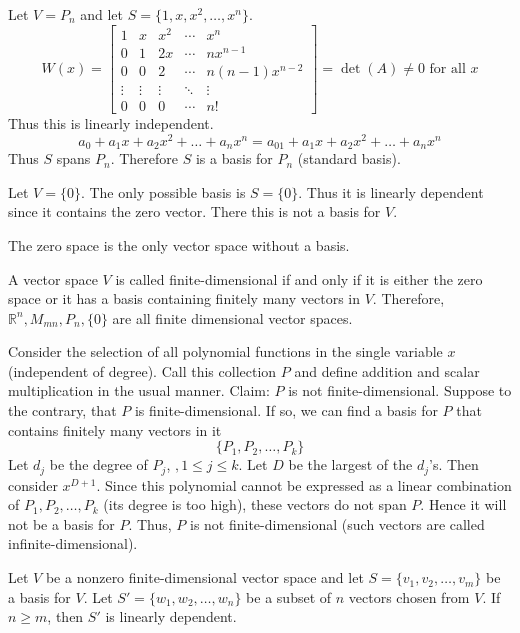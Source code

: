 \documentclass[12pt]{article}
\begin{document}
\begin{example} Let $V = P_n$ and let $S = \{1, x, x^2, \dots, x^n\}$. $$W(x) = \begin{bmatrix} 1 & x & x^2 & \cdots & x^n \\ 0 & 1 & 2x & \cdots & nx^{n - 1} \\ 0 & 0 & 2 & \cdots & n(n - 1)x^{n - 2} \\ \vdots & \vdots & \vdots & \ddots & \vdots \\ 0 & 0 & 0 & \cdots & n! \end{bmatrix} = \det(A) \neq 0 \text{ for all } x $$ Thus this is linearly independent. $$ a_0 + a_1x + a_2x^2 + \dots + a_nx^n = a_01 + a_1x + a_2x^2 + \dots + a_nx^n $$ Thus $S$ spans $P_n$. Therefore $S$ is a basis for $P_n$ (standard basis). \end{example}
\begin{example} Let $V = \{0\}$. The only possible basis is $S = \{0\}$. Thus it is linearly dependent since it contains the zero vector. There this is not a basis for $V$. \end{example} 
The zero space is the only vector space without a basis. 
\begin{definition} A vector space $V$ is called finite-dimensional if and only if it is either the zero space or it has a basis containing finitely many vectors in $V$. Therefore, $\mathbb{R}^n, M_{mn}, P_n, \{0\}$ are all finite dimensional vector spaces. \end{definition} 
Consider the selection of all polynomial functions in the single variable $x$ (independent of degree). Call this collection $P$ and define addition and scalar multiplication in the usual manner. Claim: $P$ is not finite-dimensional. Suppose to the contrary, that $P$ is finite-dimensional. If so, we can find a basis for $P$ that contains finitely many vectors in it $$\{P_1, P_2, \dots, P_k\}$$ Let $d_j$ be the degree of $P_j$, $,1 \leq j \leq k$. Let $D$ be the largest of the $d_j$'s. Then consider $x^{D + 1}$. Since this polynomial cannot be expressed as a linear combination of $P_1, P_2, \dots, P_k$ (its degree is too high), these vectors do not span $P$. Hence it will not be a basis for $P$. Thus, $P$ is not finite-dimensional (such vectors are called infinite-dimensional). 
\begin{theorem} Let $V$ be a nonzero finite-dimensional vector space and let $S = \{v_1, v_2, \dots, v_m\}$ be a basis for $V$. Let $S' = \{w_1, w_2, \dots, w_n\}$ be a subset of $n$ vectors chosen from $V$. If $n \geq m$, then $S'$ is linearly dependent. \end{theorem} 
\end{document}
